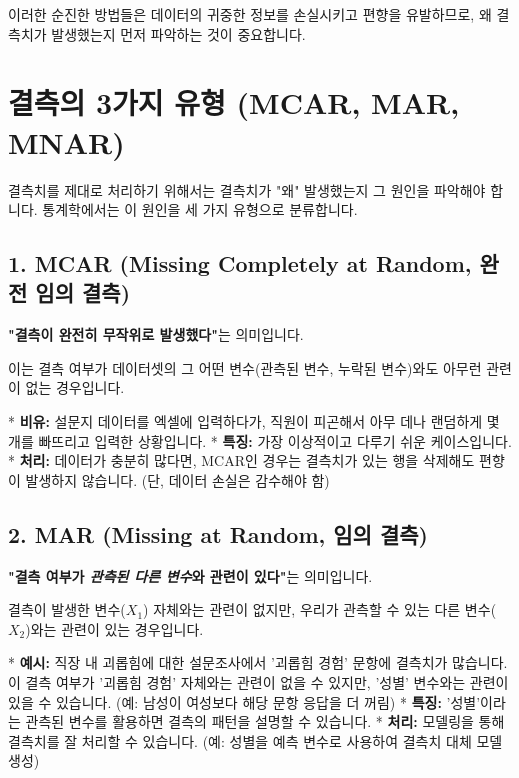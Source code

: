 \documentclass[11pt,a4paper]{book}
\theoremstyle{definition}
\begin{document}
이러한 순진한 방법들은 데이터의 귀중한 정보를 손실시키고 편향을 유발하므로, 왜 결측치가 발생했는지 먼저 파악하는 것이 중요합니다.


\section{결측의 3가지 유형 (MCAR, MAR, MNAR)}

결측치를 제대로 처리하기 위해서는 결측치가 "왜" 발생했는지 그 원인을 파악해야 합니다. 통계학에서는 이 원인을 세 가지 유형으로 분류합니다.

\subsection{1. MCAR (Missing Completely at Random, 완전 임의 결측)}

\textbf{"결측이 완전히 무작위로 발생했다"}는 의미입니다.

이는 결측 여부가 데이터셋의 그 어떤 변수(관측된 변수, 누락된 변수)와도 아무런 관련이 없는 경우입니다.

* \textbf{비유:} 설문지 데이터를 엑셀에 입력하다가, 직원이 피곤해서 아무 데나 랜덤하게 몇 개를 빠뜨리고 입력한 상황입니다.
* \textbf{특징:} 가장 이상적이고 다루기 쉬운 케이스입니다.
* \textbf{처리:} 데이터가 충분히 많다면, MCAR인 경우는 결측치가 있는 행을 삭제해도 편향이 발생하지 않습니다. (단, 데이터 손실은 감수해야 함)

\subsection{2. MAR (Missing at Random, 임의 결측)}

\textbf{"결측 여부가 \textit{관측된 다른 변수}와 관련이 있다"}는 의미입니다.

결측이 발생한 변수(\(X_1\)) 자체와는 관련이 없지만, 우리가 관측할 수 있는 다른 변수(\(X_2\))와는 관련이 있는 경우입니다.

* \textbf{예시:} 직장 내 괴롭힘에 대한 설문조사에서 '괴롭힘 경험' 문항에 결측치가 많습니다. 이 결측 여부가 '괴롭힘 경험' 자체와는 관련이 없을 수 있지만, '성별' 변수와는 관련이 있을 수 있습니다. (예: 남성이 여성보다 해당 문항 응답을 더 꺼림)
* \textbf{특징:} '성별'이라는 관측된 변수를 활용하면 결측의 패턴을 설명할 수 있습니다.
* \textbf{처리:} 모델링을 통해 결측치를 잘 처리할 수 있습니다. (예: 성별을 예측 변수로 사용하여 결측치 대체 모델 생성)
\end{document}
